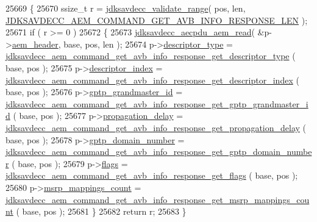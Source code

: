 \begin{DoxyCode}
25669 \{
25670     ssize\_t r = \hyperlink{group__util_ga9c02bdfe76c69163647c3196db7a73a1}{jdksavdecc\_validate\_range}( pos, len, 
      \hyperlink{group__command__get__avb__info__response_gaf41c75a91000da409b3e8c964ab192f4}{JDKSAVDECC\_AEM\_COMMAND\_GET\_AVB\_INFO\_RESPONSE\_LEN} );
25671     \textcolor{keywordflow}{if} ( r >= 0 )
25672     \{
25673         \hyperlink{group__aecpdu__aem_gae2421015dcdce745b4f03832e12b4fb6}{jdksavdecc\_aecpdu\_aem\_read}( &p->\hyperlink{structjdksavdecc__aem__command__get__avb__info__response_ae1e77ccb75ff5021ad923221eab38294}{aem\_header}, base, pos, len );
25674         p->\hyperlink{structjdksavdecc__aem__command__get__avb__info__response_ab7c32b6c7131c13d4ea3b7ee2f09b78d}{descriptor\_type} = 
      \hyperlink{group__command__get__avb__info__response_gad2031024e97206470bccff99b206804f}{jdksavdecc\_aem\_command\_get\_avb\_info\_response\_get\_descriptor\_type}
      ( base, pos );
25675         p->\hyperlink{structjdksavdecc__aem__command__get__avb__info__response_a042bbc76d835b82d27c1932431ee38d4}{descriptor\_index} = 
      \hyperlink{group__command__get__avb__info__response_gad4356122ebdad47f8c63588a4c48d2e7}{jdksavdecc\_aem\_command\_get\_avb\_info\_response\_get\_descriptor\_index}
      ( base, pos );
25676         p->\hyperlink{structjdksavdecc__aem__command__get__avb__info__response_a34b9bb3bd1ced443f07d42e42d8e9704}{gptp\_grandmaster\_id} = 
      \hyperlink{group__command__get__avb__info__response_ga8d77049563ce3ab9701d65b1b609e386}{jdksavdecc\_aem\_command\_get\_avb\_info\_response\_get\_gptp\_grandmaster\_id}
      ( base, pos );
25677         p->\hyperlink{structjdksavdecc__aem__command__get__avb__info__response_a13e128d252d16617c804f78274446eb0}{propagation\_delay} = 
      \hyperlink{group__command__get__avb__info__response_ga76172082dcd1e5c5a962eb4f017d3af3}{jdksavdecc\_aem\_command\_get\_avb\_info\_response\_get\_propagation\_delay}
      ( base, pos );
25678         p->\hyperlink{structjdksavdecc__aem__command__get__avb__info__response_ac53b4e61c0f960e16c86cfe678ca256d}{gptp\_domain\_number} = 
      \hyperlink{group__command__get__avb__info__response_ga538dcc0ede8c2bb4b3a178ff9db2ce69}{jdksavdecc\_aem\_command\_get\_avb\_info\_response\_get\_gptp\_domain\_number}
      ( base, pos );
25679         p->\hyperlink{structjdksavdecc__aem__command__get__avb__info__response_aa2585d779da0ab21273a8d92de9a0ebe}{flags} = \hyperlink{group__command__get__avb__info__response_ga3a2b82f574fce5b72cfad1976b7f5ea4}{jdksavdecc\_aem\_command\_get\_avb\_info\_response\_get\_flags}
      ( base, pos );
25680         p->\hyperlink{structjdksavdecc__aem__command__get__avb__info__response_a837781875452b1400a0515fad392d08a}{msrp\_mappings\_count} = 
      \hyperlink{group__command__get__avb__info__response_ga1ba45632973be780373a4a51105508e9}{jdksavdecc\_aem\_command\_get\_avb\_info\_response\_get\_msrp\_mappings\_count}
      ( base, pos );
25681     \}
25682     \textcolor{keywordflow}{return} r;
25683 \}
\end{DoxyCode}


